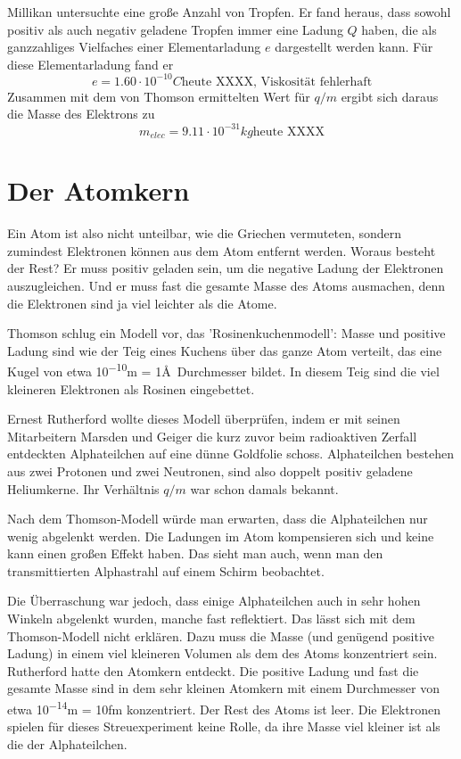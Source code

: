 Millikan untersuchte eine große Anzahl von Tropfen. Er fand heraus, dass sowohl positiv als auch negativ geladene Tropfen immer eine Ladung $Q$ haben, die als ganzzahliges Vielfaches einer Elementarladung $e$ dargestellt werden kann. Für diese Elementarladung fand er
\begin{equation}
    e = 1.60 \cdot 10^{-10} C \text{heute XXXX, Viskosität fehlerhaft}
\end{equation}
Zusammen mit dem von Thomson ermittelten Wert für $q/m$ ergibt sich daraus die Masse des Elektrons zu
\begin{equation}
    m_{elec} = 9.11 \cdot 10^{-31} kg \text{heute XXXX}
\end{equation}


\section{Der Atomkern}

Ein Atom ist also nicht unteilbar, wie die Griechen vermuteten, sondern zumindest Elektronen können aus dem Atom entfernt werden. Woraus besteht der Rest? Er muss positiv geladen sein, um die negative Ladung der Elektronen auszugleichen. Und er muss fast die gesamte Masse des Atoms ausmachen, denn die Elektronen sind ja viel leichter als die Atome.

Thomson schlug ein Modell vor, das 'Rosinenkuchenmodell': Masse und positive Ladung sind wie der Teig eines Kuchens über das ganze Atom verteilt, das eine Kugel von etwa \si{10^{-10}}{m} = 1\AA\ Durchmesser bildet. In diesem Teig sind die viel kleineren Elektronen als Rosinen eingebettet.

Ernest Rutherford wollte dieses Modell überprüfen, indem er mit seinen Mitarbeitern Marsden und Geiger die kurz zuvor beim radioaktiven Zerfall entdeckten Alphateilchen auf eine dünne Goldfolie schoss. Alphateilchen bestehen aus zwei Protonen und zwei Neutronen, sind also doppelt positiv geladene Heliumkerne. Ihr Verhältnis $q/m$ war schon damals bekannt.

Nach dem Thomson-Modell würde man erwarten, dass die Alphateilchen nur wenig abgelenkt werden. Die Ladungen im Atom kompensieren sich und keine kann einen großen Effekt haben. Das sieht man auch, wenn man den transmittierten Alphastrahl auf einem Schirm beobachtet.

Die Überraschung war jedoch, dass einige Alphateilchen auch in sehr hohen Winkeln abgelenkt wurden, manche fast reflektiert. Das lässt sich mit dem Thomson-Modell nicht erklären. Dazu muss die Masse (und genügend positive Ladung) in einem viel kleineren Volumen als dem des Atoms konzentriert sein. Rutherford hatte den Atomkern entdeckt. Die positive Ladung und fast die gesamte Masse sind in dem sehr kleinen Atomkern mit einem Durchmesser von etwa \si{10^{-14}}{m} = \si{10}{fm} konzentriert. Der Rest des Atoms ist leer. Die Elektronen spielen für dieses Streuexperiment keine Rolle, da ihre Masse viel kleiner ist als die der Alphateilchen.


